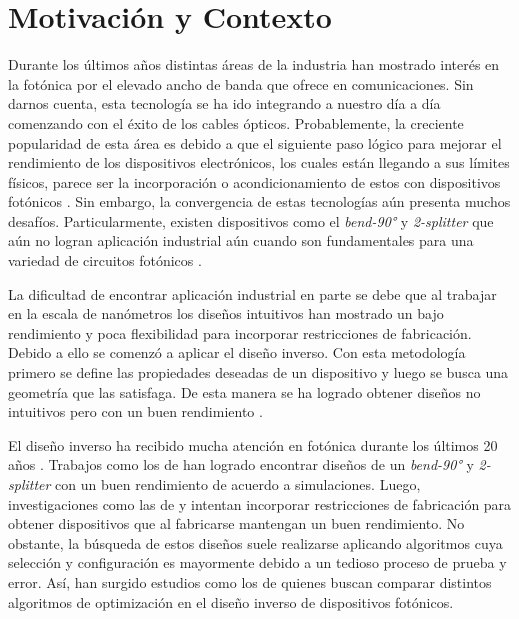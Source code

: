 \chapter{Motivación y Contexto}

Durante los últimos años distintas áreas de la industria han mostrado interés en la fotónica por el elevado ancho de banda que ofrece en comunicaciones.
Sin darnos cuenta, esta tecnología se ha ido integrando a nuestro día a día comenzando con el éxito de los cables ópticos.
Probablemente, la creciente popularidad de esta área es debido a que el siguiente paso lógico para mejorar el rendimiento de los dispositivos electrónicos, los cuales están llegando a sus límites físicos, parece ser la incorporación o acondicionamiento de estos con dispositivos fotónicos \citep{Glick2018, LukasChrostowski2010}.
Sin embargo, la convergencia de estas tecnologías aún presenta muchos desafíos. Particularmente, existen dispositivos como el \emph{bend-90°} y \emph{2-splitter} que aún no logran aplicación industrial aún cuando son fundamentales para una variedad de circuitos fotónicos \citep{Molesky2018}.


La dificultad de encontrar aplicación industrial en parte se debe que al trabajar en la escala de nanómetros los diseños intuitivos han mostrado un bajo rendimiento y poca flexibilidad para incorporar restricciones de fabricación. 
Debido a ello se comenzó a aplicar el diseño inverso. 
Con esta metodología primero se define las propiedades deseadas de un dispositivo y luego se busca una geometría que las satisfaga.
De esta manera se ha logrado obtener diseños no intuitivos pero con un buen rendimiento \citep{Su2020}.

El diseño inverso ha recibido mucha atención en fotónica durante los últimos 20 años \citep{Molesky2018}. 
Trabajos como los de \cite{Su2020} han logrado encontrar diseños de un \emph{bend-90°} y \emph{2-splitter} con un buen rendimiento de acuerdo a simulaciones.
Luego, investigaciones como las de \cite{Su2018} y \cite{Piggott2017} intentan incorporar restricciones de fabricación para obtener dispositivos que al fabricarse mantengan un buen rendimiento. 
No obstante, la búsqueda de estos diseños suele realizarse aplicando algoritmos cuya selección y configuración es mayormente debido a un tedioso proceso de prueba y error.
Así, han surgido estudios como los de \cite{Schneider2019, Elsawy2020, Gregory2015} quienes buscan comparar distintos algoritmos de optimización en el diseño inverso de dispositivos fotónicos.


